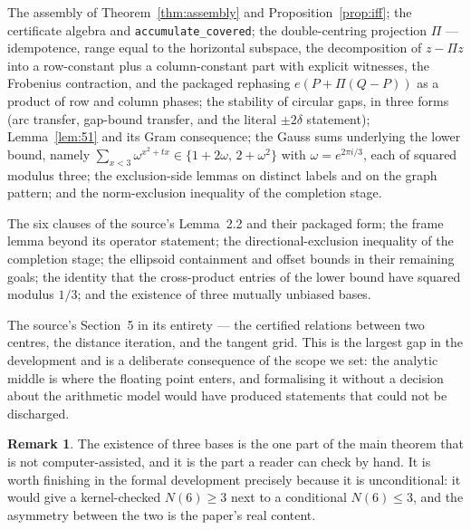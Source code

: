 \documentclass[11pt]{article}
\theoremstyle{definition}
\newtheorem{remark}[theorem]{Remark}
\begin{document}
\begin{description}[leftmargin=1.2em,style=nextline]
\item[Proved, in full.] The assembly of Theorem~\ref{thm:assembly} and Proposition~\ref{prop:iff};
  the certificate algebra and \texttt{accumulate\_covered}; the double-centring projection
  $\Pi$ --- idempotence, range equal to the horizontal subspace, the decomposition of $z-\Pi z$
  into a row-constant plus a column-constant part with explicit witnesses, the Frobenius
  contraction, and the packaged rephasing $e(P+\Pi(Q-P))$ as a product of row and column phases;
  the stability of circular gaps, in three forms (arc transfer, gap-bound transfer, and the literal
  $\pm2\delta$ statement); Lemma~\ref{lem:51} and its Gram consequence; the Gauss sums underlying
  the lower bound, namely $\sum_{x<3}\omega^{x^2+tx}\in\{1+2\omega,\,2+\omega^2\}$ with
  $\omega=e^{2\pi i/3}$, each of squared modulus three; the exclusion-side lemmas on distinct labels
  and on the graph pattern; and the norm-exclusion inequality of the completion stage.
\item[Stated, with named holes.] The six clauses of the source's Lemma~2.2 and their packaged form;
  the frame lemma beyond its operator statement; the directional-exclusion inequality of the
  completion stage; the ellipsoid containment and offset bounds in their remaining goals; the
  identity that the cross-product entries of the lower bound have squared modulus $1/3$; and the
  existence of three mutually unbiased bases.
\item[Absent.] The source's Section~5 in its entirety --- the certified relations between two
  centres, the distance iteration, and the tangent grid. This is the largest gap in the development
  and is a deliberate consequence of the scope we set: the analytic middle is where the floating
  point enters, and formalising it without a decision about the arithmetic model would have
  produced statements that could not be discharged.
\end{description}

\begin{remark}
The existence of three bases is the one part of the main theorem that is not computer-assisted, and
it is the part a reader can check by hand. It is worth finishing in the formal development precisely
because it is unconditional: it would give a kernel-checked $N(6)\ge 3$ next to a conditional
$N(6)\le 3$, and the asymmetry between the two is the paper's real content.
\end{remark}
\end{document}

